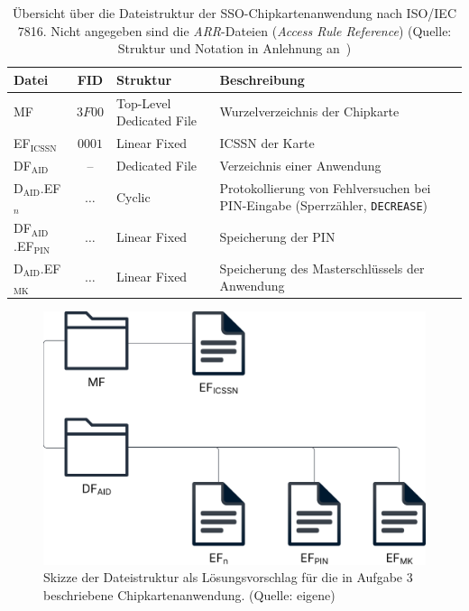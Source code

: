 \begin{table}[h]
    \setlength{\tabcolsep}{0.5em}
    \def\arraystretch{1.5}
    \centering
    \begin{tabular}{|l|c|l|p{7cm}|}
        \hline
        \textbf{Datei} & \textbf{FID} & \textbf{Struktur} & \textbf{Beschreibung} \\
        \hline
        MF & $3F00$ & Top-Level Dedicated File & Wurzelverzeichnis der Chipkarte \\
        \hline
        EF$_{\text{ICSSN}}$ & $0001$ & Linear Fixed & ICSSN der Karte \\
        \hline
        DF$_{\text{AID}}$ & -- & Dedicated File & Verzeichnis einer Anwendung \\
        \hline
        D$_{\text{AID}}$.EF$_n$ & $\ldots$ & Cyclic & Protokollierung von Fehlversuchen bei PIN-Eingabe (Sperrzähler, \texttt{DECREASE}) \\
        \hline
        DF$_{\text{AID}}$.EF$_{\text{PIN}}$ & $\ldots$ & Linear Fixed & Speicherung der PIN \\
        \hline
        D$_{\text{AID}}$.EF$_{\text{MK}}$ & $\ldots$ & Linear Fixed & Speicherung des Masterschlüssels der Anwendung  \\
        \hline
    \end{tabular}
    \caption{Übersicht über die Dateistruktur der SSO-Chipkartenanwendung nach ISO/IEC 7816. Nicht angegeben sind die \textit{ARR}-Dateien (\textit{Access Rule Reference}) (Quelle: Struktur und Notation in Anlehnung an~\cite[\textbf{Tabelle 15.11}, 897]{RE02})}
    \label{tab:struktur}
\end{table}


\begin{figure}
    \centering
    \includegraphics[scale=0.4]{aufgabe 3/img/struktur.svg}
    \caption{Skizze der Dateistruktur als Lösungsvorschlag für die in Aufgabe 3 beschriebene Chipkartenanwendung. (Quelle: eigene)}
    \label{fig:struktur}
\end{figure}

